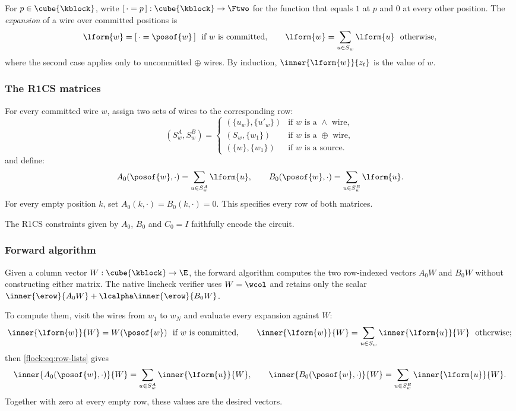 For $p\in\cube{\kblock}$, write $[\,\cdot=p\,]:\cube{\kblock}\to\Ftwo$ for the function that equals $1$ at $p$ and $0$ at every other position. The \emph{expansion} of a wire over committed positions is
\begin{equation}\label{flock:eq:expand}
\lform{w}=[\,\cdot=\posof{w}\,]\ \text{ if $w$ is committed},\qquad \lform{w}=\sum_{u\in S_w}\lform{u}\ \text{ otherwise},
\end{equation}
where the second case applies only to uncommitted $\oplus$ wires. By induction, $\inner{\lform{w}}{z_t}$ is the value of $w$.

\subsubsection{The R1CS matrices}\label{flock:rows}

For every committed wire $w$, assign two sets of wires to the corresponding row:
\[
(S^A_w,S^B_w)=
\begin{cases}
(\{u_w\},\{u'_w\}) & \text{if $w$ is a $\wedge$ wire},\\
(S_w,\{w_1\}) & \text{if $w$ is a $\oplus$ wire},\\
(\{w\},\{w_1\}) & \text{if $w$ is a source}.
\end{cases}
\]
and define:
\begin{equation}\label{flock:eq:row-lists}
A_0(\posof{w},\cdot)=\sum_{u\in S^A_w}\lform{u},\qquad B_0(\posof{w},\cdot)=\sum_{u\in S^B_w}\lform{u}.
\end{equation}
For every empty position $k$, set $A_0(k,\cdot)=B_0(k,\cdot)=0$. This specifies every row of both matrices.

\vspace{3mm}

The R1CS constraints given by $A_0$, $B_0$ and $C_0=I$ faithfully encode the circuit.
\subsubsection{Forward algorithm}\label{flock:forward}

Given a column vector $W:\cube{\kblock}\to\E$, the forward algorithm computes the two row-indexed vectors $A_0W$ and $B_0W$ without constructing either matrix. The native lincheck verifier uses $W=\wcol$ and retains only the scalar $\inner{\erow}{A_0W}+\lcalpha\inner{\erow}{B_0W}$.

To compute them, visit the wires from $w_1$ to $w_N$ and evaluate every expansion against $W$:
\[
\inner{\lform{w}}{W}=W(\posof{w})\ \text{ if $w$ is committed},\qquad \inner{\lform{w}}{W}=\sum_{u\in S_w}\inner{\lform{u}}{W}\ \text{ otherwise};
\]
then \eqref{flock:eq:row-lists} gives
\begin{equation}\label{flock:eq:row-pair}
\inner{A_0(\posof{w},\cdot)}{W}=\sum_{u\in S^A_w}\inner{\lform{u}}{W},\qquad \inner{B_0(\posof{w},\cdot)}{W}=\sum_{u\in S^B_w}\inner{\lform{u}}{W}.
\end{equation}
Together with zero at every empty row, these values are the desired vectors.

